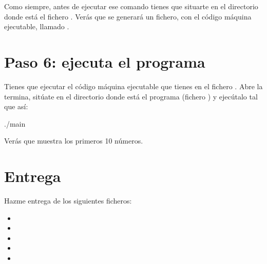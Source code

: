 \documentclass[letterpaper,10pt,spanish]{sphinxmanual}
\begin{document}
\sphinxAtStartPar
Como siempre, antes de ejecutar ese comando tienes que situarte en el directorio donde está el fichero . Verás que se generará un fichero, con el código máquina ejecutable, llamado .


\section{Paso 6: ejecuta el programa}
\label{\detokenize{lab1:paso-6-ejecuta-el-programa}}
\sphinxAtStartPar
Tienes que ejecutar el código máquina ejecutable que tienes en el fichero . Abre la termina, sitúate en el directorio donde está el programa (fichero ) y ejecútalo tal que así:

\begin{sphinxVerbatim}[commandchars=\\\{\}]
 ./main
\end{sphinxVerbatim}

\sphinxAtStartPar
Verás que muestra los primeros 10 números.


\section{Entrega}
\label{\detokenize{lab1:entrega}}
\sphinxAtStartPar
Hazme entrega de los siguientes ficheros:
\begin{itemize}
\item {} 
\sphinxAtStartPar
{}

\item {} 
\sphinxAtStartPar
{}

\item {} 
\sphinxAtStartPar
{}

\item {} 
\sphinxAtStartPar
{}

\item {} 
\sphinxAtStartPar
{}

\end{itemize}
\end{document}
